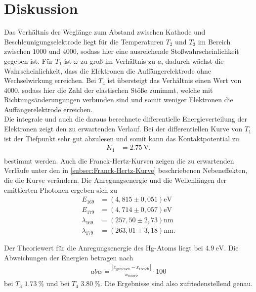 \section{Diskussion}
\label{sec:Diskussion}

Das Verhältnis der Weglänge zum Abstand zwischen Kathode und Beschleunigungselektrode liegt für die Temperaturen $T_2$ und $T_3$
im Bereich zwischen $1000$ und $4000$, sodass hier eine ausreichende Stoßwahrscheinlichkeit gegeben ist.
Für $T_1$ ist $\bar{\omega}$ zu groß im Verhältnis zu $a$, dadurch wächst die Wahrscheinlichkeit, dass die Elektronen die Auffängerelektrode
ohne Wechselwirkung erreichen.
Bei $T_4$ ist übersteigt das Verhältnis einen Wert von $4000$, sodass hier die Zahl der elastischen Stöße zunimmt, welche mit 
Richtungsänderungungen verbunden sind und somit weniger Elektronen die Auffängerelektrode erreichen.\\

Die integrale und auch die daraus berechnete differentielle Energieverteilung der Elektronen zeigt den zu erwartenden Verlauf.
Bei der differentiellen Kurve von $T_1$ ist der Tiefpunkt sehr gut abzulesen und somit kann das Kontaktpotential zu 
\begin{align*}
    K_1 &= \qty{2.75}{\volt}.\\
\end{align*}
bestimmt werden.
Auch die Franck-Hertz-Kurven zeigen die zu erwartenden Verläufe unter den in \autoref{subsec:Franck-Hertz-Kurve} beschriebenen Nebeneffekten,
die die Kurve verändern.
Die Anregungsenergie und die Wellenlängen der emittierten Photonen ergeben sich zu
\begin{align*}
    E_{169} &= (4,815 \pm 0,051) \si{\electronvolt}\\
    E_{179} &= (4,714 \pm 0,057) \si{\electronvolt}\\
    \lambda_{169} &= (257,50 \pm 2,73) \si{\nano\meter}\\
    \lambda_{179} &= (263,01 \pm 3,18) \si{\nano\meter}.
\end{align*}

Der Theoriewert für die Anregungsenergie des Hg-Atoms liegt bei $\qty{4.9}{\electronvolt}$\cite{Anregungsenergie}.
Die Abweichungen der Energien betragen nach 
\begin{align*}
    abw=\frac{|x_\mathrm{gemessen}-x_\mathrm{theorie}|}{x_\mathrm{theorie}}\cdot 100 \label{eqn:abweich}
\end{align*}
bei $T_3$ $\qty{1.73}{\percent}$ und bei $T_4$ $\qty{3.80}{\percent}$.
Die Ergebnisse sind also zufriedenstellend genau.\\


